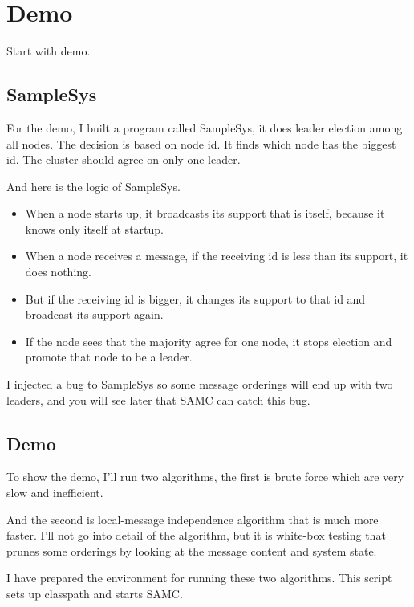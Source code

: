 \section{Demo}

Start with demo.

\subsection{SampleSys}

For the demo, I built a program called SampleSys, it does leader election among
all nodes. The decision is based on node id. It finds which node has the biggest
id. The cluster should agree on only one leader.

And here is the logic of SampleSys.

\begin{itemize}

\item When a node starts up, it broadcasts its support that is itself, because
it knows only itself at startup.

\item When a node receives a message, if the receiving id is less than its
support, it does nothing.

\item But if the receiving id is bigger, it changes its support to that id and
broadcast its support again.

\item If the node sees that the majority agree for one node, it stops election
and promote that node to be a leader.

\end{itemize}

I injected a bug to SampleSys so some message orderings will end up with two
leaders, and you will see later that SAMC can catch this bug.

\subsection{Demo}
To show the demo, I'll run two algorithms, the first is brute force which are
very slow and inefficient. 

And the second is local-message independence algorithm that is much more
faster. I'll not go into detail of the algorithm, but it is white-box testing
that prunes some orderings by looking at the message content and system state.

I have prepared the environment for running these two algorithms. This script
sets up classpath and starts SAMC.

